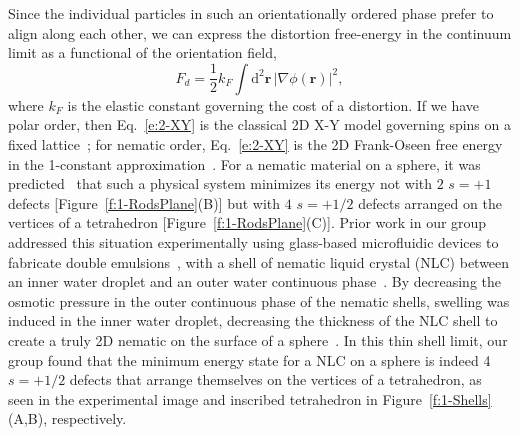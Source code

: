 Since the individual particles in such an orientationally ordered phase prefer to align along each other, we can express the distortion free-energy in the continuum limit as a functional of the orientation field,
\begin{equation}
  F_d = \frac{1}{2} k_F \int \textrm{d}^2\mathbf{r} \, |\nabla \phi(\mathbf{r})|^2,\label{e:2-XY}
\end{equation}
where $k_F$ is the elastic constant governing the cost of a distortion.
If we have polar order, then Eq.~\ref{e:2-XY} is the classical 2D X-Y model governing spins on a fixed lattice~\cite{RN175}; for nematic order, Eq.~\ref{e:2-XY} is the 2D Frank-Oseen free energy~\cite{RN61} in the 1-constant approximation~\cite{RN33}.
For a nematic material on a sphere, it was predicted~\cite{RN42,RN104,RN43} that such a physical system minimizes its energy not with $2$ $s=+1$ defects [Figure~\ref{f:1-RodsPlane}(B)] but with $4$ $s=+1/2$ defects arranged on the vertices of a tetrahedron [Figure~\ref{f:1-RodsPlane}(C)].
Prior work in our group addressed this situation experimentally using glass-based microfluidic devices to fabricate double emulsions~\cite{RN272}, with a shell of nematic liquid crystal (NLC) between an inner water droplet and an outer water continuous phase~\cite{RN105,RN45}.
By decreasing the osmotic pressure in the outer continuous phase of the nematic shells, swelling was induced in the inner water droplet, decreasing the thickness of the NLC shell to create a truly 2D nematic on the surface of a sphere~\cite{RN45}.
In this thin shell limit, our group found that the minimum energy state for a NLC on a sphere is indeed 4 $s = +1/2$ defects that arrange themselves on the vertices of a tetrahedron, as seen in the experimental image and inscribed tetrahedron in Figure~\ref{f:1-Shells}(A,B), respectively.
